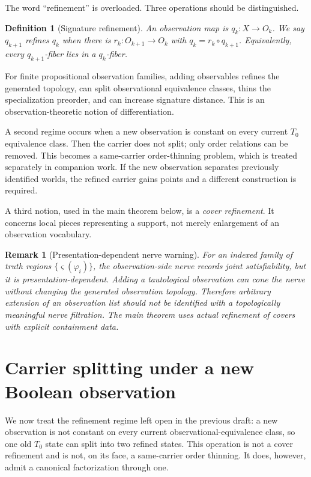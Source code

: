 \documentclass[11pt]{article}
\newtheorem{definition}[theorem]{Definition}
\newtheorem{remark}[theorem]{Remark}
\begin{document}
The word ``refinement'' is overloaded.  Three operations should be distinguished.

\begin{definition}[Signature refinement]
An observation map is $q_k:X\to O_k$.  We say $q_{k+1}$ refines $q_k$ when there is $r_k:O_{k+1}\to O_k$ with $q_k=r_k\circ q_{k+1}$.  Equivalently, every $q_{k+1}$-fiber lies in a $q_k$-fiber.
\end{definition}

For finite propositional observation families, adding observables refines the generated topology, can split observational equivalence classes, thins the specialization preorder, and can increase signature distance.  This is an observation-theoretic notion of differentiation.

A second regime occurs when a new observation is constant on every current $T_0$ equivalence class.  Then the carrier does not split; only order relations can be removed.  This becomes a same-carrier order-thinning problem, which is treated separately in companion work.  If the new observation separates previously identified worlds, the refined carrier gains points and a different construction is required.

A third notion, used in the main theorem below, is a \emph{cover refinement}.  It concerns local pieces representing a support, not merely enlargement of an observation vocabulary.

\begin{remark}[Presentation-dependent nerve warning]
For an indexed family of truth regions $\{\varsigma(\varphi_i)\}$, the observation-side nerve records joint satisfiability, but it is presentation-dependent.  Adding a tautological observation can cone the nerve without changing the generated observation topology.  Therefore arbitrary extension of an observation list should not be identified with a topologically meaningful nerve filtration.  The main theorem uses actual refinement of covers with explicit containment data.
\end{remark}

\section{Carrier splitting under a new Boolean observation}\label{sec:carrier-splitting}

We now treat the refinement regime left open in the previous draft: a new
observation is not constant on every current observational-equivalence class, so
one old $T_0$ state can split into two refined states.  This operation is not a
cover refinement and is not, on its face, a same-carrier order thinning.  It does,
however, admit a canonical factorization through one.
\end{document}
